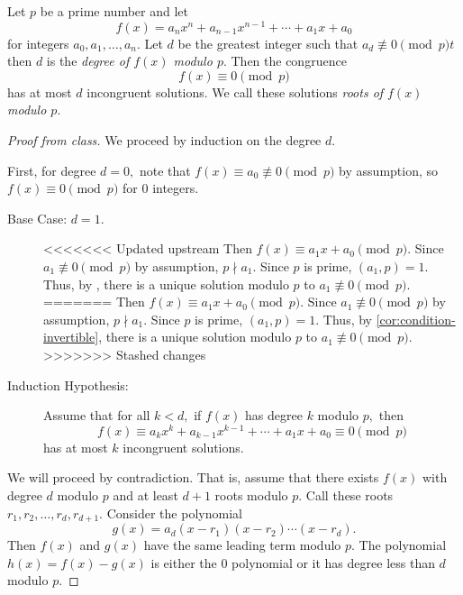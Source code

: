 \documentclass{ximera}
\begin{document}
\begin{theorem}[Lagrange]\label{thm:lagrange}
    Let $p$ be a prime number and let 
    \[f(x)=a_n x^n +a_{n-1} x^{n-1}+\cdots +a_1 x+a_0\]
    for integers $a_0,a_1,\dots,a_n.$ Let $d$ be the greatest integer such that $a_d\not\equiv 0\pmod{p}t$ then $d$ is the \emph{degree of $f(x)$ modulo $p.$}
    Then the congruence 
    \[f(x)\equiv 0\pmod{p}\]
    has at most $d$ incongruent solutions. We call these solutions \emph{roots of $f(x)$ modulo $p.$}
    

    \begin{proof}[Proof from class]
        We proceed by induction on the degree $d.$
        
        First, for degree $d=0,$ note that $f(x)\equiv a_0\not\equiv 0\pmod{p}$ by assumption, so $f(x)\equiv 0\pmod{p}$ for $0$ integers.

            
        \begin{description}
                
            \item[Base Case: $d=1$.] 
<<<<<<< Updated upstream
            Then $f(x)\equiv a_1 x+a_0\pmod{p}$. Since $a_1\not\equiv 0\pmod{p}$ by assumption, $p\nmid a_1.$ Since $p$ is prime, $(a_1,p)=1.$ Thus, by , there is a unique solution modulo $p$ to $a_1\not\equiv 0\pmod{p}.$
=======
            Then $f(x)\equiv a_1 x+a_0\pmod{p}$. Since $a_1\not\equiv 0\pmod{p}$ by assumption, $p\nmid a_1.$ Since $p$ is prime, $(a_1,p)=1.$ Thus, by \cref{cor:condition-invertible}, there is a unique solution modulo $p$ to $a_1\not\equiv 0\pmod{p}.$
>>>>>>> Stashed changes

            \item[Induction Hypothesis:]
            Assume that for all $k\lt d,$ if $f(x)$ has degree $k$ modulo $p,$ then 
            \[f(x)\equiv a_k x^k +a_{k-1}x^{k-1}+\cdots+a_1x+a_0\equiv 0 \pmod{p}\]
            has at most $k$ incongruent solutions.
        \end{description}

        We will proceed by contradiction. That is, assume that there exists $f(x)$ with degree $d$ modulo $p$ and at least $d+1$ roots modulo $p.$ Call these roots $r_1,r_2,\dots,r_d,r_{d+1}.$ Consider the polynomial \[g(x)=a_d(x-r_1)(x-r_2)\cdots (x-r_d).\]
        Then $f(x)$ and $g(x)$ have the same leading term modulo $p.$ The polynomial $h(x)=f(x)-g(x)$ is either the $0$ polynomial or it has degree less than $d$ modulo $p.$


\end{proof}
\end{theorem}
\end{document}

